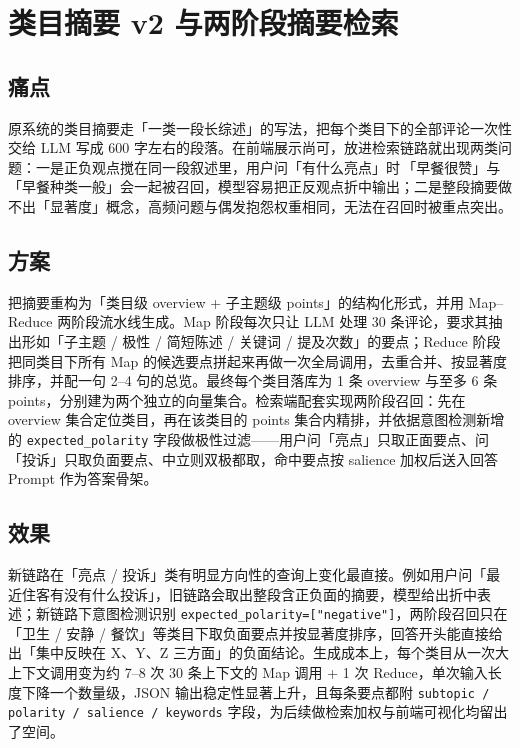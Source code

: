 \documentclass[11pt]{ctexart}
\begin{document}
\section{类目摘要 v2 与两阶段摘要检索}

\subsection{痛点}

原系统的类目摘要走「一类一段长综述」的写法，把每个类目下的全部评论一次性交给 LLM 写成 600 字左右的段落。在前端展示尚可，放进检索链路就出现两类问题：一是正负观点搅在同一段叙述里，用户问「有什么亮点」时\,「早餐很赞」与「早餐种类一般」会一起被召回，模型容易把正反观点折中输出；二是整段摘要做不出「显著度」概念，高频问题与偶发抱怨权重相同，无法在召回时被重点突出。

\subsection{方案}

把摘要重构为「类目级 overview + 子主题级 points」的结构化形式，并用 Map--Reduce 两阶段流水线生成。Map 阶段每次只让 LLM 处理 30 条评论，要求其抽出形如「子主题 / 极性 / 简短陈述 / 关键词 / 提及次数」的要点；Reduce 阶段把同类目下所有 Map 的候选要点拼起来再做一次全局调用，去重合并、按显著度排序，并配一句 2--4 句的总览。最终每个类目落库为 1 条 overview 与至多 6 条 points，分别建为两个独立的向量集合。检索端配套实现两阶段召回：先在 overview 集合定位类目，再在该类目的 points 集合内精排，并依据意图检测新增的 \texttt{expected\_polarity} 字段做极性过滤——用户问「亮点」只取正面要点、问「投诉」只取负面要点、中立则双极都取，命中要点按 salience 加权后送入回答 Prompt 作为答案骨架。

\subsection{效果}

新链路在「亮点 / 投诉」类有明显方向性的查询上变化最直接。例如用户问「最近住客有没有什么投诉」，旧链路会取出整段含正负面的摘要，模型给出折中表述；新链路下意图检测识别 \texttt{expected\_polarity=["negative"]}，两阶段召回只在「卫生 / 安静 / 餐饮」等类目下取负面要点并按显著度排序，回答开头能直接给出「集中反映在 X、Y、Z 三方面」的负面结论。生成成本上，每个类目从一次大上下文调用变为约 7--8 次 30 条上下文的 Map 调用 + 1 次 Reduce，单次输入长度下降一个数量级，JSON 输出稳定性显著上升，且每条要点都附 \texttt{subtopic / polarity / salience / keywords} 字段，为后续做检索加权与前端可视化均留出了空间。
\end{document}
